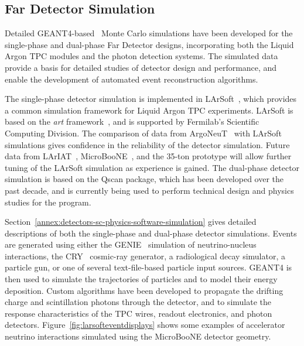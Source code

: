 \subsection{Far Detector Simulation}
\label{sec:detectors-sc-physics-software-simulation-fd}

Detailed GEANT4-based~\cite{GEANT4:NIM,GEANT4} Monte Carlo simulations have been 
developed for the single-phase and dual-phase Far Detector designs,
incorporating both the Liquid Argon TPC modules
and the photon detection systems. The simulated data provide
a basis for detailed studies of detector design and performance, 
and enable the development of automated event reconstruction algorithms.

The single-phase detector simulation is implemented in LArSoft~\cite{Church:2013hea},
which provides a common simulation framework for Liquid Argon TPC experiments.
LArSoft is based on the {\it art} framework~\cite{Green:2012gv}, and is supported by Fermilab's
Scientific Computing Division.
The comparison of data from ArgoNeuT~\cite{Anderson:2012vc} with LArSoft
simulations gives confidence in the reliability of the detector simulation.
Future data from LArIAT~\cite{Adamson:2013/02/28tla,Cavanna:2014iqa},
MicroBooNE~\cite{Chen:2007ae,Jones:2011ci,microboonecdr}, and the 35-ton prototype will allow
further tuning of the LArSoft simulation as experience is gained.
The dual-phase detector simulation is based on the Qscan package,
which has been developed over the past decade, and is currently
being used to perform technical design and physics studies for
the \cerndualproto{} program.

Section~\ref{annex:detectors-sc-physics-software-simulation} gives detailed
descriptions of both the single-phase and dual-phase detector simulations.
Events are generated using either the GENIE~\cite{GENIE} simulation of 
neutrino-nucleus interactions, the CRY~\cite{Cosmic-CRY,Cosmic-CRY-protons,CRY-url} cosmic-ray generator, 
a radiological decay simulator, a particle gun, or one of several
text-file-based particle input sources. GEANT4 is then used to simulate the trajectories
of particles and to model their energy deposition.  
Custom algorithms have been developed to propagate the drifting charge
and scintillation photons through the detector, and to simulate the
response characteristics of the TPC wires, readout electronics, and photon detectors.
Figure~\ref{fig:larsofteventdisplays} shows some examples of accelerator
neutrino interactions simulated using the MicroBooNE detector geometry.

